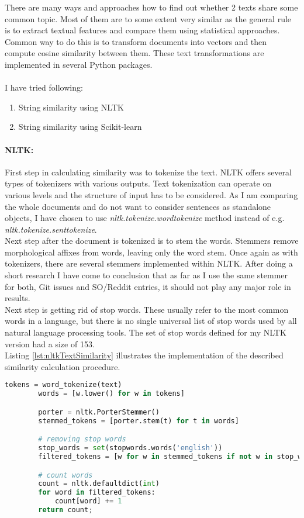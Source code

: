 There are many ways and approaches how to find out whether 2 texts share some common topic. Most of them are to some extent very similar as the general rule is to extract textual features and compare them using statistical approaches. Common way to do this is to transform documents into vectors and then compute cosine similarity between them. These text transformations are implemented in several Python packages.\\
\\
I have tried following:
\begin{enumerate}
\item String similarity using NLTK
\item String similarity using Scikit-learn
\end{enumerate}

\paragraph{NLTK:}First step in calculating similarity was to tokenize the text. NLTK offers several types of tokenizers with various outputs. Text tokenization can operate on various levels and the structure of input has to be considered. As I am comparing the whole documents and do not want to consider sentences as standalone objects, I have chosen to use \textit{nltk.tokenize.wordtokenize} method instead of e.g. \textit{nltk.tokenize.senttokenize}.\\
Next step after the document is tokenized is to stem the words. Stemmers remove morphological affixes from words, leaving only the word stem. Once again as with tokenizers, there are several stemmers implemented within NLTK. After doing a short research I have come to conclusion that as far as I use the same stemmer for both, Git issues and SO/Reddit entries, it should not play any major role in results.\\
Next step is getting rid of stop words. These usually refer to the most common words in a language, but there is no single universal list of stop words used by all natural language processing tools. The set of stop words defined for my NLTK version had a size of 153.\\
Listing \ref{lst:nltkTextSimilarity} illustrates the implementation of the described similarity calculation procedure.

\begin{lstlisting}[caption={Text similarity implementation with NLTK},label={lst:nltkTextSimilarity},language=Python]
		tokens = word_tokenize(text)
		words = [w.lower() for w in tokens]

		porter = nltk.PorterStemmer()
		stemmed_tokens = [porter.stem(t) for t in words]

		# removing stop words
		stop_words = set(stopwords.words('english'))
		filtered_tokens = [w for w in stemmed_tokens if not w in stop_words]

		# count words
		count = nltk.defaultdict(int)
		for word in filtered_tokens:
			count[word] += 1
		return count;
\end{lstlisting}

